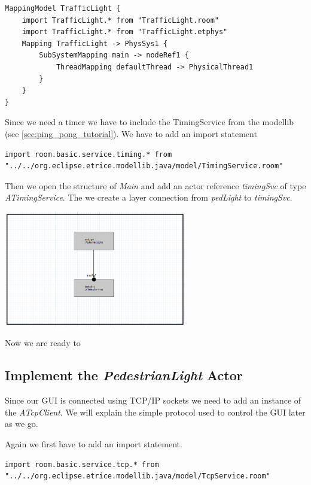 \begin{lstlisting}[language=etmap]
MappingModel TrafficLight {
	import TrafficLight.* from "TrafficLight.room"
	import TrafficLight.* from "TrafficLight.etphys"
	Mapping TrafficLight -> PhysSys1 {
		SubSystemMapping main -> nodeRef1 {
			ThreadMapping defaultThread -> PhysicalThread1
		}
	}
}
\end{lstlisting}

Since we need a timer we have to include the TimingService from the modellib (see \ref{sec:ping_pong_tutorial}).
We have to add an import statement

\begin{lstlisting}[language=ROOM]
import room.basic.service.timing.* from "../../org.eclipse.etrice.modellib.java/model/TimingService.room"
\end{lstlisting}

Then we open the structure of \textit{Main} and add an actor reference \textit{timingSvc} of type \textit{ATimingService}.
The we create a layer connection from \textit{pedLight} to \textit{timingSvc}.

\includegraphics[width=0.6\textwidth]{images/018-timingSvc.png}

Now we are ready to 

\subsection{Implement the \textit{PedestrianLight} Actor}

Since our GUI is connected using TCP/IP sockets we need to add an instance of the \textit{ATcpClient}.
We will explain the simple protocol used to control the GUI later as we go.

Again we first have to add an import statement.

\begin{lstlisting}[language=ROOM]
import room.basic.service.tcp.* from "../../org.eclipse.etrice.modellib.java/model/TcpService.room"
\end{lstlisting}

